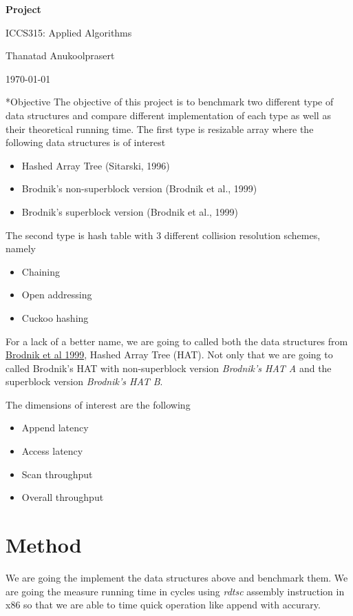 \documentclass{article} %
\newcommand{\question}[2][]{\begin{flushleft}
        \textbf{Question #1}: \textit{#2}

\end{flushleft}}
\newcommand{\maketitletwo}[2][]{\begin{center}
        \Large{\textbf{Project #1}
            
            ICCS315: Applied Algorithms} %
        \vspace{5pt}
        
        \normalsize{Thanatad Anukoolprasert  %
        
        \today}        %
        \vspace{15pt}
        
\end{center}}
\begin{document}
    \maketitletwo[]  %
    
    \section*{Objective}
    The objective of this project is to benchmark two different type of data structures and compare different
    implementation of each type as well as their theoretical running time.
    The first type is resizable array where the following data structures is of interest
    \begin{itemize}
        \item Hashed Array Tree (Sitarski, 1996)
        \item Brodnik's non-superblock version (Brodnik et al., 1999)
        \item Brodnik's superblock version (Brodnik et al., 1999)
    \end{itemize}
    
    The second type is hash table with 3 different collision resolution schemes, namely
    \begin{itemize}
        \item Chaining
        \item Open addressing
        \item Cuckoo hashing
    \end{itemize}
    
    For a lack of a better name, we are going to called both the data structures from \href{ https://sedgewick.io/wp-content/themes/sedgewick/papers/1999Optimal.pdf}{ Brodnik et al 1999}, Hashed Array Tree (HAT).
    Not only that we are going to called Brodnik's HAT with non-superblock version \emph{Brodnik's HAT A} and the superblock version \emph{Brodnik's HAT B}.

    The dimensions of interest are the following
    \begin{itemize}
        \item Append latency
        \item Access latency
        \item Scan throughput
        \item Overall throughput
    \end{itemize}

    \section*{Method}
    We are going the implement the data structures above and benchmark them. We are going the measure running time in cycles using
    \emph{rdtsc} assembly instruction in x86 so that we are able to time quick operation like append with accurary.
\end{document}
